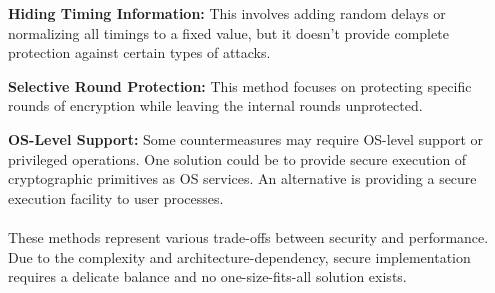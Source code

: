 \textbf{Hiding Timing Information:} This involves adding random delays or normalizing all timings to a fixed value, but it doesn't provide complete protection against certain types of attacks.

\textbf{Selective Round Protection:} This method focuses on protecting specific rounds of encryption while leaving the internal rounds unprotected.

\textbf{OS-Level Support:} Some countermeasures may require OS-level support or privileged operations. One solution could be to provide secure execution of cryptographic primitives as OS services. An alternative is providing a secure execution facility to user processes.

\paragraph{}
These methods represent various trade-offs between security and performance. Due to the complexity and architecture-dependency, secure implementation requires a delicate balance and no one-size-fits-all solution exists.
